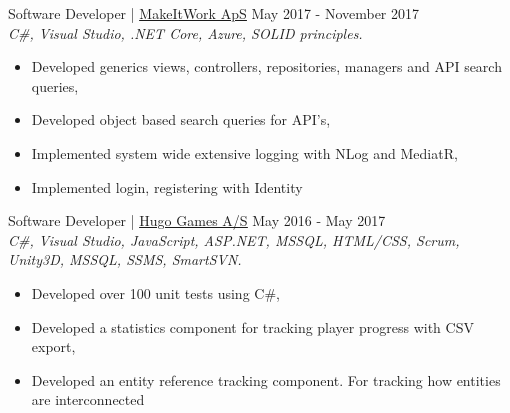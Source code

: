 \documentclass[margin, 10pt, hidelinks]{res} %
\newcommand{\emphasize}{\large} %
\begin{document}
\begin{resume}
{\emphasize Software Developer} | \href{http://www.makeitwork.dk}{\underline{MakeItWork ApS}}  \hfill May 2017 - November 2017  \\
{\it C\#, Visual Studio, .NET Core, Azure, SOLID principles. } %
\begin{itemize} \setlength{\itemindent}{-0.1in}\itemsep 0pt %
\item Developed generics views, controllers, repositories, managers and API search queries,
\item Developed object based search queries for API's,
\item Implemented system wide extensive logging with NLog and MediatR,
\item Implemented login, registering with Identity
\end{itemize}

{\emphasize Software Developer} | \href{https://www.hugogames.com}{\underline{Hugo Games A/S}}   \hfill May 2016 - May 2017  \\
{\it C\#, Visual Studio, JavaScript, ASP.NET, MSSQL, HTML/CSS, Scrum, Unity3D, MSSQL, SSMS, SmartSVN.} %
\begin{itemize} \setlength{\itemindent}{-0.1in}\itemsep 0pt %
\item Developed over 100 unit tests using C\#,
\item Developed a statistics component for tracking player progress with CSV export,
\item Developed an entity reference tracking component. For tracking how entities are interconnected
\end{itemize}




\end{resume}
\end{document}
